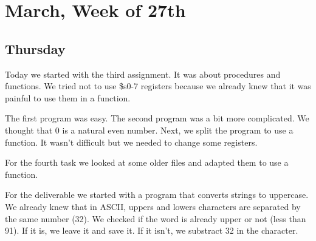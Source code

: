 \documentclass{report}
\begin{document}
\chapter{March, Week of 27th}

\section{Thursday}
Today we started with the third assignment. It was about procedures and functions. We tried not to use \$s0-7 registers because we already knew that it was painful to use them in a function. 

The first program was easy. The second program was a bit more complicated. We thought that 0 is a natural even number. Next, we split the program to use a function. It wasn't difficult but we needed to change some registers.



For the fourth task we looked at some older files and adapted them to use a function.

For the deliverable we started with a program that converts strings to uppercase. We already knew that in ASCII, uppers and lowers characters are separated by the same number (32). We checked if the word is already upper or not (less than 91). If it is, we leave it and save it. If it isn't, we substract 32 in the character.
\end{document}
